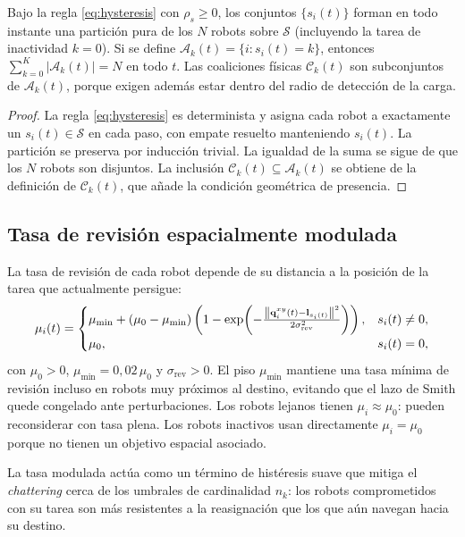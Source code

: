 \begin{lema}
\label{lema:factibilidad}
Bajo la regla \eqref{eq:hysteresis} con $\rho_s \geq 0$, los conjuntos $\{s_i(t)\}$
forman en todo instante una partición pura de los $N$ robots sobre $\mathcal{S}$
(incluyendo la tarea de inactividad $k=0$). Si se define
$\mathcal{A}_k(t)=\{i:s_i(t)=k\}$, entonces
$\sum_{k=0}^K |\mathcal{A}_k(t)| = N$ en todo $t$. Las coaliciones físicas
$\mathcal{C}_k(t)$ son subconjuntos de $\mathcal{A}_k(t)$, porque exigen además estar
dentro del radio de detección de la carga.
\end{lema}
\begin{proof}
La regla \eqref{eq:hysteresis} es determinista y asigna cada robot a exactamente un
$s_i(t) \in \mathcal{S}$ en cada paso, con empate resuelto manteniendo $s_i(t)$.
La partición se preserva por inducción trivial. La igualdad de la suma se sigue
de que los $N$ robots son disjuntos. La inclusión
$\mathcal{C}_k(t)\subseteq\mathcal{A}_k(t)$ se obtiene de la definición de
$\mathcal{C}_k(t)$, que añade la condición geométrica de presencia.
\end{proof}

\subsection{Tasa de revisión espacialmente modulada}

La tasa de revisión de cada robot depende de su distancia a la posición de la
tarea que actualmente persigue:
\begin{equation}
  \mu_i(t) =
  \begin{cases}
  \mu_{\min} + (\mu_0 - \mu_{\min})
    \left(1 - \exp\!\left(-\frac{\left\|\mathbf{q}_i^{xy}(t) -
    \mathbf{l}_{s_i(t)}\right\|^2}{2\sigma_{\text{rev}}^2}\right)\right),
    & s_i(t)\neq 0,\\
  \mu_0, & s_i(t)=0,
  \end{cases}
  \label{eq:revision_rate}
\end{equation}
con $\mu_0 > 0$, $\mu_{\min} = 0{,}02\,\mu_0$ y $\sigma_{\text{rev}} > 0$.
El piso $\mu_{\min}$ mantiene una tasa mínima de revisión incluso en robots muy
próximos al destino, evitando que el lazo de Smith quede congelado ante perturbaciones. Los robots lejanos tienen $\mu_i \approx \mu_0$:
pueden reconsiderar con tasa plena. Los robots inactivos usan directamente
$\mu_i = \mu_0$ porque no tienen un objetivo espacial asociado.

La tasa modulada actúa como un término de histéresis suave que mitiga el
\emph{chattering} cerca de los umbrales de cardinalidad $n_k$: los robots comprometidos
con su tarea son más resistentes a la reasignación que los que aún navegan
hacia su destino.


